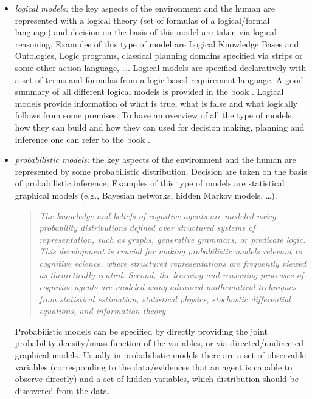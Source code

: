 \begin{itemize}
\item \emph{logical models:} the key aspects of the environment and
  the human are represented with a logical theory (set of formulas of
  a logical/formal language) and decision on the basis of this model
  are taken via logical reasoning. Examples of this type of model are
  Logical Knowledge Bases and Ontologies, Logic programs, classical
  planning domains specified via strips or some other action language,
  \dots.  Logical models are specified declaratively with a set of
  terms and formulas from a logic based requirement language. A good
  summary of all different logical models is provided in the book
  \cite{lifschitz2008handbook}. Logical models provide information of
  what is true, what is false and what logically follows from some
  premises.  To have an overview of all the type of models, how they
  can build and how they can used for decision making, planning and
  inference one can refer to the book \cite{minker2012logic}.

\item \emph{probabilistic models:} the key aspects of the environment
  and the human are represented by some probabilistic
  distribution. Decision are taken on the basis of probabilistic
  inference. Examples of this type of models are statistical graphical
  models (e.g., Bayesian networks, hidden Markov models, \dots).
  \begin{quote}
  \it The knowledge and beliefs of
cognitive agents are modeled using probability distributions
defined over structured systems of representation,
such as graphs, generative grammars, or
predicate logic. This development is crucial for making
probabilistic models relevant to cognitive science, where
structured representations are frequently viewed as
theoretically central. Second, the learning and reasoning
processes of cognitive agents are modeled using
advanced mathematical techniques from statistical
estimation, statistical physics, stochastic differential
equations, and information theory
\hfill \cite{chater2006probabilistic}
\end{quote}
Probabilistic models can be specified by directly providing the joint
probability density/mass function of the variables, or via
directed/undirected graphical models. Usually in probabilistic models
there are a set of observable variables (corresponding to the
data/evidences that an agent is capable to observe directly) and a set
of hidden variables, which distribution should be discovered from the
data.


\end{itemize}
